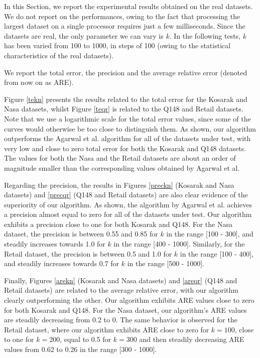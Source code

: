 \documentclass[final,3p,times]{elsarticle}
\begin{document}
In this Section, we report the experimental results obtained on the real datasets. We do not report on the performances, owing to the fact that processing the largest dataset on a single processor requires just a few milliseconds. Since the datasets are real, the only parameter we can vary is $k$. In the following tests, $k$ has been varied from 100 to 1000, in steps of 100 (owing to the statistical characteristics of the real datasets). 

We report the total error, the precision and the average relative error (denoted from now on as ARE). 

Figure \ref{tekn} presents the results related to the total error for the Kosarak and Nasa datasets, whilst Figure \ref{teqr} is related to the Q148 and Retail datasets. Note that we use a logarithmic scale for the total error values, since some of the curves would otherwise be too close to distinguish them. As shown, our algorithm outperforms the Agarwal et al. algorithm for all of the datasets under test, with very low and close to zero total error for both the Kosarak and Q148 datasets. The values for both the Nasa and the Retail datasets are about an order of magnitude smaller than the corresponding values obtained by Agarwal et al. 

Regarding the precision, the results in Figures \ref{preckn} (Kosarak and Nasa datasets) and \ref{precqr} (Q148 and Retail datasets) are also clear evidence of the superiority of our algorithm. As shown, the algorithm by Agarwal et al. achieves a precision almost equal to zero for all of the datasets under test. Our algorithm exhibits a precision close to one for both Kosarak and Q148. For the Nasa dataset, the precision is between 0.55 and 0.85 for $k$ in the range [100 - 300], and steadily increases towards 1.0 for $k$ in the range [400 - 1000]. Similarly, for the Retail dataset, the precision is between 0.5 and 1.0 for $k$ in the range [100 - 400], and steadily increases towards 0.7 for $k$ in the range [500 - 1000].

Finally, Figures \ref{arekn} (Kosarak and Nasa datasets) and \ref{areqr} (Q148 and Retail datasets) are related to the average relative error, with our algorithm clearly outperforming the other. Our algorithm exhibits ARE values close to zero for both Kosarak and Q148. For the Nasa dataset, our algorithm's ARE values are steadily decreasing from 0.2 to 0. The same behavior is observed for the Retail dataset, where our algorithm exhibits ARE close to zero for $k = 100$, close to one for $k = 200$, equal to 0.5 for $k = 300$ and then steadily decreasing ARE values from 0.62 to 0.26 in the range [300 - 1000].
\end{document}
